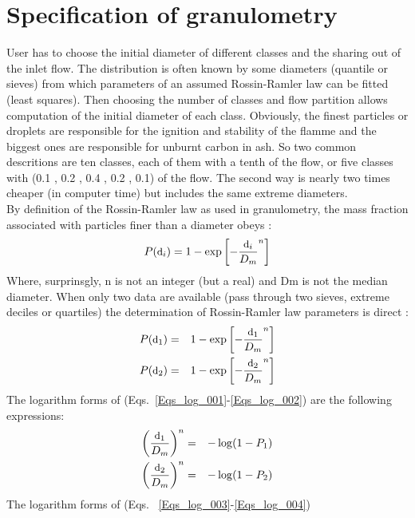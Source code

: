 \section{Specification of granulometry}

User has to choose the initial diameter of different classes and the sharing out
of the inlet flow. The distribution is often known by some diameters (quantile
or sieves) from which parameters of an assumed Rossin-Ramler law can be fitted
(least squares). Then choosing the number of classes and flow partition allows
computation of the initial diameter of each class. Obviously, the finest
particles or droplets are responsible for the ignition and stability of the
flamme and the biggest ones are responsible for unburnt carbon in ash. So two
common descritions are ten classes, each of them with a tenth of the flow, or
five classes with (0.1 , 0.2 , 0.4 , 0.2 , 0.1) of the flow. The second way is
nearly two times cheaper (in computer time) but includes the same extreme
diameters. \\
By definition of the Rossin-Ramler law as used in granulometry, the mass
fraction associated with particles finer than a diameter obeys :
\begin{equation}
  \displaystyle P(\mbox{\small d}_i) = 1-\exp{\left[-\displaystyle\frac{\mbox{\small d}_i}{D_m} ^n \right]}
\end{equation} 
Where, surprinsgly, n is not an integer (but a real) and Dm is not the median
diameter. When only two data are available (pass through two sieves, extreme
deciles or quartiles) the determination of Rossin-Ramler law parameters is
direct :
\begin{eqnarray}
  \displaystyle P(\mbox{\small d}_1) &=& 1-\exp\left[-\frac{\mbox{\small d}_1}{D_m}^n\right] \label{Eqs_log_001} \\
  \displaystyle P(\mbox{\small d}_2) &=& 1-\exp\left[-\frac{\mbox{\small d}_2}{D_m}^n\right] \label{Eqs_log_002}
\end{eqnarray}
The logarithm forms of (Eqs.~\ref{Eqs_log_001}-\ref{Eqs_log_002}) are the
following expressions:
\begin{eqnarray}
  \displaystyle \left(\frac{\mbox{\small d}_1}{D_m} \right)^n &=& - \log(1-P_1) \label{Eqs_log_003} \\
  \displaystyle \left(\frac{\mbox{\small d}_2}{D_m} \right)^n &=& - \log(1-P_2) \label{Eqs_log_004} 
\end{eqnarray}
The logarithm forms of (Eqs. ~\ref{Eqs_log_003}-\ref{Eqs_log_004})
